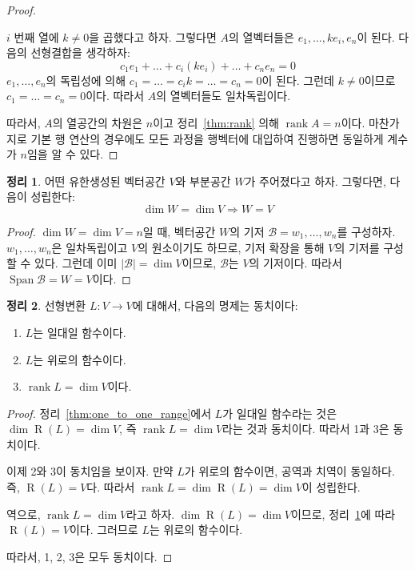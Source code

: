 \documentclass[unfonts,oneside,a4paper]{oblivoir}
\theoremstyle{definition}
\theoremstyle{theorem}
\newtheorem{theorem}{정리}[section]
\theoremstyle{theorem}
\theoremstyle{remark}
\theoremstyle{remark}
\theoremstyle{remark}
\theoremstyle{remark}
\renewcommand{\vec}[1]{\bm{\mathit{#1}}}
\newcommand{\vecz}{\bm{\mathrm{0}}}
\DeclareMathOperator{\Span}{Span}
\DeclareMathOperator{\Range}{R}
\DeclareMathOperator{\rank}{rank}
\begin{document}
\begin{proof}
\begin{enumerate}
            $i$ 번째 열에 $k \neq 0$을 곱했다고 하자.
            그렇다면 $A$의 열벡터들은 $\vec e_1, \dots, k \vec e_i, \vec e_n$이 된다.
            다음의 선형결합을 생각하자:
            \begin{equation*}
                c_1 \vec e_1 + \dots + c_i (k \vec e_i) + \dots + c_n \vec e_n = \vecz
            \end{equation*}
            $\vec e_1, \dots, \vec e_n$의 독립성에 의해 $c_1 = \dots = c_i k = \dots = c_n = 0$이 된다.
            그런데 $k \neq 0$이므로 $c_1 = \dots = c_n = 0$이다.
            따라서 $A$의 열벡터들도 일차독립이다.
    \end{enumerate}
    따라서, $A$의 열공간의 차원은 $n$이고 정리~\ref{thm:rank} 의해 $\rank A = n$이다.
    마찬가지로 기본 행 연산의 경우에도 모든 과정을 행벡터에 대입하여 진행하면 동일하게 계수가 $n$임을 알 수 있다.
\end{proof}

\begin{theorem}\label{thm17}
    어떤 유한생성된 벡터공간 $V$와 부분공간 $W$가 주어졌다고 하자.
    그렇다면, 다음이 성립한다:
    \begin{equation*}
        \dim W = \dim V \Rightarrow W = V
    \end{equation*}
\end{theorem}

\begin{proof}
    $\dim W = \dim V = n$일 때, 벡터공간 $W$의 기저 $\mathcal B = \vec w_1, \dots, \vec w_n$를 구성하자.
    $\vec w_1, \dots, \vec w_n$은 일차독립이고 $V$의 원소이기도 하므로, 기저 확장을 통해 $V$의 기저를 구성할 수 있다.
    그런데 이미 $|\mathcal B| = \dim V$이므로, $\mathcal B$는 $V$의 기저이다.
    따라서 $\Span \mathcal B = W = V$이다.
\end{proof}

\begin{theorem} \label{thm:onto}
    선형변환 $L: V \rightarrow V$에 대해서, 다음의 명제는 동치이다:
    \begin{enumerate}
        \item $L$는 일대일 함수이다.
        \item $L$는 위로의 함수이다.
        \item $\rank L = \dim V$이다.
    \end{enumerate}
\end{theorem}

\begin{proof}
    정리~\ref{thm:one_to_one_range}에서 $L$가 일대일 함수라는 것은 $\dim \Range(L) = \dim V$, 즉 $\rank L = \dim V$라는 것과 동치이다.
    따라서 1과 3은 동치이다.

    이제 2와 3이 동치임을 보이자.
    만약 $L$가 위로의 함수이면, 공역과 치역이 동일하다.
    즉, $\Range(L) = V$다.
    따라서 $\rank L = \dim \Range(L) = \dim V$이 성립한다.

    역으로, $\rank L = \dim V$라고 하자.
    $\dim \Range(L) = \dim V$이므로, 정리~\ref{thm17}에 따라 $\Range(L) = V$이다.
    그러므로 $L$는 위로의 함수이다.

    따라서, 1, 2, 3은 모두 동치이다.
\end{proof}
\end{document}
